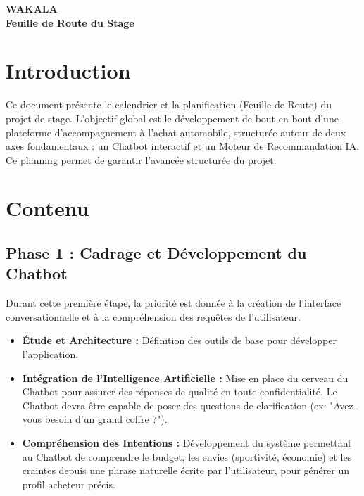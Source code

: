 \documentclass[a4paper, 11pt]{article}
\begin{document}
\begin{center}
    {\Huge \textcolor{primaryBlue}{\textbf{WAKALA}}}\\[0.2cm]
    {\large \bfseries \textcolor{primaryBlue}{Feuille de Route du Stage}}
\end{center}

\vspace{0.5cm}

\section*{Introduction}
Ce document présente le calendrier et la planification (Feuille de Route) du projet de stage. L'objectif global est le développement de bout en bout d'une plateforme d'accompagnement à l'achat automobile, structurée autour de deux axes fondamentaux : un Chatbot interactif et un Moteur de Recommandation IA. Ce planning permet de garantir l'avancée structurée du projet.

\vspace{0.3cm}

\section*{Contenu}

\subsection*{Phase 1 : Cadrage et Développement du Chatbot}
Durant cette première étape, la priorité est donnée à la création de l'interface conversationnelle et à la compréhension des requêtes de l'utilisateur.
\begin{itemize}[label=\textbullet]
    \item \textbf{Étude et Architecture :} Définition des outils de base pour développer l'application.
    \item \textbf{Intégration de l'Intelligence Artificielle :} Mise en place du cerveau du Chatbot pour assurer des réponses de qualité en toute confidentialité. Le Chatbot devra être capable de poser des questions de clarification (ex: "Avez-vous besoin d'un grand coffre ?").
    \item \textbf{Compréhension des Intentions :} Développement du système permettant au Chatbot de comprendre le budget, les envies (sportivité, économie) et les craintes depuis une phrase naturelle écrite par l'utilisateur, pour générer un profil acheteur précis.
\end{itemize}
\end{document}
